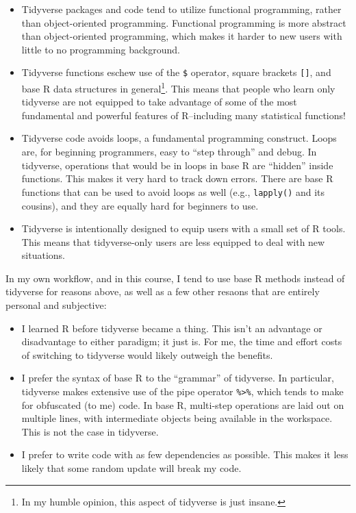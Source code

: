 \documentclass[
  13,
  letterpaper,
]{report}
\begin{document}
\begin{itemize}
\item
  Tidyverse packages and code tend to utilize functional programming,
  rather than object-oriented programming. Functional programming is
  more abstract than object-oriented programming, which makes it harder
  to new users with little to no programming background.
\item
  Tidyverse functions eschew use of the \texttt{\$} operator, square
  brackets \texttt{{[}{]}}, and base R data structures in
  general\footnote{In my humble opinion, this aspect of tidyverse is
    just insane.}. This means that people who learn only tidyverse are
  not equipped to take advantage of some of the most fundamental and
  powerful features of R--including many statistical functions!
\item
  Tidyverse code avoids loops, a fundamental programming construct.
  Loops are, for beginning programmers, easy to ``step through'' and
  debug. In tidyverse, operations that would be in loops in base R are
  ``hidden'' inside functions. This makes it very hard to track down
  errors. There are base R functions that can be used to avoid loops as
  well (e.g., \texttt{lapply()} and its cousins), and they are equally
  hard for beginners to use.
\item
  Tidyverse is intentionally designed to equip users with a small set of
  R tools. This means that tidyverse-only users are less equipped to
  deal with new situations.
\end{itemize}

In my own workflow, and in this course, I tend to use base R methods
instead of tidyverse for reasons above, as well as a few other resaons
that are entirely personal and subjective:

\begin{itemize}
\item
  I learned R before tidyverse became a thing. This isn't an advantage
  or disadvantage to either paradigm; it just is. For me, the time and
  effort costs of switching to tidyverse would likely outweigh the
  benefits.
\item
  I prefer the syntax of base R to the ``grammar'' of tidyverse. In
  particular, tidyverse makes extensive use of the pipe operator
  \texttt{\%\textgreater{}\%}, which tends to make for obfuscated (to
  me) code. In base R, multi-step operations are laid out on multiple
  lines, with intermediate objects being available in the workspace.
  This is not the case in tidyverse.
\item
  I prefer to write code with as few dependencies as possible. This
  makes it less likely that some random update will break my code.
\end{itemize}
\end{document}
